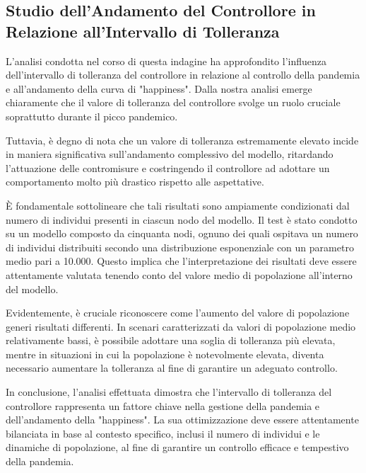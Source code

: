 \subsection{Studio dell'Andamento del Controllore in Relazione all'Intervallo di Tolleranza}
L'analisi condotta nel corso di questa indagine ha approfondito 
l'influenza dell'intervallo di tolleranza del controllore in relazione 
al controllo della pandemia e all'andamento della curva di "happiness". 
Dalla nostra analisi emerge chiaramente che il valore di tolleranza del 
controllore svolge un ruolo cruciale soprattutto durante il picco pandemico.

Tuttavia, è degno di nota che un valore di tolleranza estremamente 
elevato incide in maniera significativa sull'andamento complessivo del 
modello, ritardando l'attuazione delle contromisure e costringendo il 
controllore ad adottare un comportamento molto più drastico rispetto alle 
aspettative.

È fondamentale sottolineare che tali risultati sono ampiamente 
condizionati dal numero di individui presenti in ciascun nodo del modello. 
Il test è stato condotto su un modello composto da cinquanta nodi, ognuno 
dei quali ospitava un numero di individui distribuiti secondo una 
distribuzione esponenziale con un parametro medio pari a 10.000. 
Questo implica che l'interpretazione dei risultati deve essere 
attentamente valutata tenendo conto del valore medio di popolazione 
all'interno del modello.

Evidentemente, è cruciale riconoscere come l'aumento del valore di 
popolazione generi risultati differenti. In scenari caratterizzati da 
valori di popolazione medio relativamente bassi, è possibile adottare 
una soglia di tolleranza più elevata, mentre in situazioni in cui la 
popolazione è notevolmente elevata, diventa necessario aumentare la 
tolleranza al fine di garantire un adeguato controllo.

In conclusione, l'analisi effettuata dimostra che l'intervallo di 
tolleranza del controllore rappresenta un fattore chiave nella gestione 
della pandemia e dell'andamento della "happiness". La sua ottimizzazione 
deve essere attentamente bilanciata in base al contesto specifico, inclusi 
il numero di individui e le dinamiche di popolazione, al fine di garantire 
un controllo efficace e tempestivo della pandemia.

